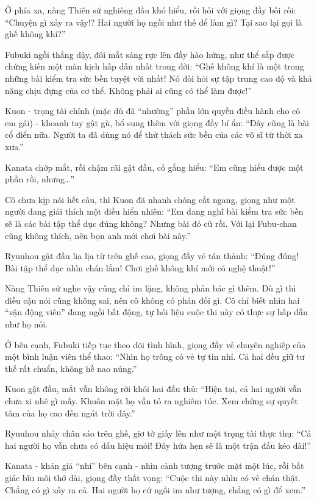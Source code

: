 \documentclass[../main.tex]{subfiles}
\begin{document}
Ở phía xa, nàng Thiên sứ nghiêng đầu khó hiểu, rồi hỏi với giọng đầy bối rối: ``Chuyện gì xảy ra vậy!? Hai người họ ngồi như thế để làm gì? Tại sao lại gọi là ghế không khí?''

Fubuki ngồi thẳng dậy, đôi mắt sáng rực lên đầy hào hứng, như thể sắp được chứng kiến một màn kịch hấp dẫn nhất trong đời: ``Ghế không khí là một trong những bài kiểm tra sức bền tuyệt vời nhất! Nó đòi hỏi sự tập trung cao độ và khả năng chịu đựng của cơ thể. Không phải ai cũng có thể làm được!''

Kuon - trọng tài chính (mặc dù đã ``nhường'' phần lớn quyền điều hành cho cô em gái) - khoanh tay gật gù, bổ sung thêm với giọng đầy bí ẩn: ``Đây cũng là bài cổ điển nữa. Người ta đã dùng nó để thử thách sức bền của các võ sĩ từ thời xa xưa.''

Kanata chớp mắt, rồi chậm rãi gật đầu, cố gắng hiểu: ``Em cũng hiểu được một phần rồi, nhưng\dots''

Cô chưa kịp nói hết câu, thì Kuon đã nhanh chóng cắt ngang, giọng như một người đang giải thích một điều hiển nhiên: ``Em đang nghĩ bài kiểm tra sức bền sẽ là các bài tập thể dục đúng không? Nhưng bài đó cũ rồi. Với lại Fubu-chan cũng không thích, nên bọn anh mới chơi bài này.''

Ryuuhou gật đầu lia lịa từ trên ghế cao, giọng đầy vẻ tán thành: ``Đúng đúng! Bài tập thể dục nhìn chán lắm! Chơi ghế không khí mới có nghệ thuật!''

Nàng Thiên sứ nghe vậy cũng chỉ im lặng, không phản bác gì thêm. Dù gì thì điều cậu nói cũng không sai, nên cô không có phản đối gì. Cô chỉ biết nhìn hai ``vận động viên'' đang ngồi bất động, tự hỏi liệu cuộc thi này có thực sự hấp dẫn như họ nói.

Ở bên cạnh, Fubuki tiếp tục theo dõi tình hình, giọng đầy vẻ chuyên nghiệp của một bình luận viên thể thao: ``Nhìn họ trông có vẻ tự tin nhỉ. Cả hai đều giữ tư thế rất chuẩn, không hề nao núng.''

Kuon gật đầu, mắt vẫn không rời khỏi hai đấu thủ: ``Hiện tại, cả hai người vẫn chưa xi nhê gì mấy. Khuôn mặt họ vẫn tỏ ra nghiêm túc. Xem chừng sự quyết tâm của họ cao đến ngút trời đây.''

Ryuuhou nhảy chân sáo trên ghế, giơ tờ giấy lên như một trọng tài thực thụ: ``Cả hai người họ vẫn chưa có dấu hiệu mỏi! Đây hứa hẹn sẽ là một trận đấu kéo dài!''

Kanata - khán giả ``nhí'' bên cạnh - nhìn cảnh tượng trước mặt một lúc, rồi bất giác bĩu môi thở dài, giọng đầy thất vọng: ``Cuộc thi này nhìn có vẻ chán thật. Chẳng có gì xảy ra cả. Hai người họ cứ ngồi im như tượng, chẳng có gì để xem.''
\end{document}
